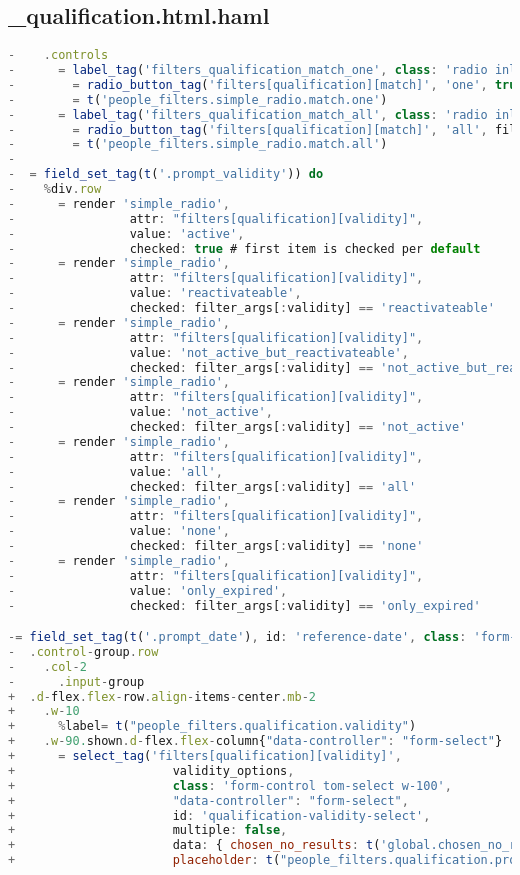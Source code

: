 \subsection{\_qualification.html.haml}
\begin{lstlisting}[language=JavaScript]
-    .controls
-      = label_tag('filters_qualification_match_one', class: 'radio inline') do
-        = radio_button_tag('filters[qualification][match]', 'one', true)
-        = t('people_filters.simple_radio.match.one')
-      = label_tag('filters_qualification_match_all', class: 'radio inline') do
-        = radio_button_tag('filters[qualification][match]', 'all', filter_args[:match] == 'all', %w(not_active none only_expired).include?(filter_args[:validity]) ? { disabled: true } : {})
-        = t('people_filters.simple_radio.match.all')
-
-  = field_set_tag(t('.prompt_validity')) do
-    %div.row
-      = render 'simple_radio',
-                attr: "filters[qualification][validity]",
-                value: 'active',
-                checked: true # first item is checked per default
-      = render 'simple_radio',
-                attr: "filters[qualification][validity]",
-                value: 'reactivateable',
-                checked: filter_args[:validity] == 'reactivateable'
-      = render 'simple_radio',
-                attr: "filters[qualification][validity]",
-                value: 'not_active_but_reactivateable',
-                checked: filter_args[:validity] == 'not_active_but_reactivateable'
-      = render 'simple_radio',
-                attr: "filters[qualification][validity]",
-                value: 'not_active',
-                checked: filter_args[:validity] == 'not_active'
-      = render 'simple_radio',
-                attr: "filters[qualification][validity]",
-                value: 'all',
-                checked: filter_args[:validity] == 'all'
-      = render 'simple_radio',
-                attr: "filters[qualification][validity]",
-                value: 'none',
-                checked: filter_args[:validity] == 'none'
-      = render 'simple_radio',
-                attr: "filters[qualification][validity]",
-                value: 'only_expired',
-                checked: filter_args[:validity] == 'only_expired'

-= field_set_tag(t('.prompt_date'), id: 'reference-date', class: 'form-horizontal', style: "display: #{%w(all none).include?(filter_args[:validity]) ? 'none' : 'block'};") do
-  .control-group.row
-    .col-2
-      .input-group
+  .d-flex.flex-row.align-items-center.mb-2
+    .w-10
+      %label= t("people_filters.qualification.validity")
+    .w-90.shown.d-flex.flex-column{"data-controller": "form-select"}
+      = select_tag('filters[qualification][validity]',
+                      validity_options,
+                      class: 'form-control tom-select w-100',
+                      "data-controller": "form-select",
+                      id: 'qualification-validity-select',
+                      multiple: false,
+                      data: { chosen_no_results: t('global.chosen_no_results'),
+                      placeholder: t("people_filters.qualification.prompt_qualification_validity_placeholder") } )
\end{lstlisting}

